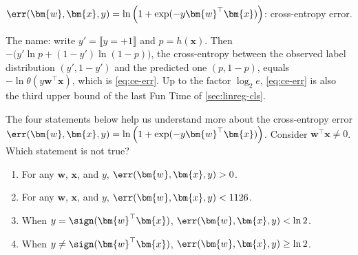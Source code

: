 \begin{moral}
    \(\err(\bm{w}, \bm{x}, y) = \ln \left( 1 + \exp(-y \bm{w}^\top \bm{x})
    \right)\): cross-entropy error.
\end{moral}

The name: write \(y' = \llbracket y = +1 \rrbracket\) and \(p = h(\bm{x})\).
Then \(-\bigl( y' \ln p + (1 - y') \ln(1 - p) \bigr)\), the cross-entropy
between the observed label distribution \((y', 1 - y')\) and the predicted one
\((p, 1 - p)\), equals \(-\ln \theta(y \bm{w}^\top \bm{x})\), which is
\eqref{eq:ce-err}. Up to the factor \(\log_2 e\), \eqref{eq:ce-err} is also the
third upper bound of the last Fun Time of \autoref{sec:linreg-cls}.

\begin{exercise}
    The four statements below help us understand more about the cross-entropy
    error \(\err(\bm{w}, \bm{x}, y) = \ln \left( 1 + \exp(-y \bm{w}^\top
    \bm{x}) \right)\). Consider \(\bm{w}^\top \bm{x} \neq 0\). Which statement
    is not true?
    \begin{enumerate}[(1)]
        \item For any \(\bm{w}\), \(\bm{x}\), and \(y\), \(\err(\bm{w}, \bm{x},
            y) > 0\).
        \item For any \(\bm{w}\), \(\bm{x}\), and \(y\), \(\err(\bm{w}, \bm{x},
            y) < 1126\).
        \item When \(y = \sign(\bm{w}^\top \bm{x})\), \(\err(\bm{w}, \bm{x}, y)
            < \ln 2\).
        \item When \(y \neq \sign(\bm{w}^\top \bm{x})\), \(\err(\bm{w},
            \bm{x}, y) \ge \ln 2\).
    \end{enumerate}
\end{exercise}

